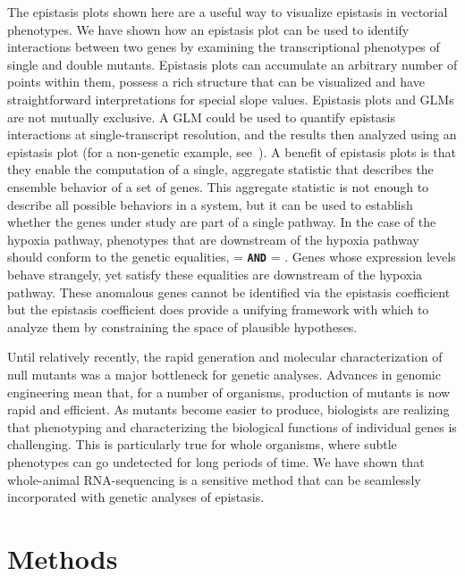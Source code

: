 The epistasis plots shown here are a useful way to visualize epistasis in
vectorial phenotypes. We have shown how an epistasis plot can be used to
identify interactions between two genes by examining the transcriptional
phenotypes of single and double mutants.
Epistasis plots can accumulate an
arbitrary number of points within them, possess a rich structure that can be
visualized and have straightforward interpretations for special slope values.
Epistasis plots and GLMs are not mutually exclusive. A GLM could be used to
quantify epistasis interactions at single-transcript resolution, and the results
then analyzed using an epistasis plot (for a non-genetic example,
see~\citet{Angeles-Albores2017a}).
A benefit of epistasis
plots is that they enable the computation of a single, aggregate statistic that
describes the ensemble behavior of a set of genes. This aggregate statistic
is not enough to describe all possible behaviors in a system, but it can be used
to establish whether the genes under study are part of a single pathway. In the
case of the hypoxia pathway, phenotypes that are downstream of the hypoxia
pathway should conform to the genetic equalities, \eglhif{} = \hif{}
\textbf{\texttt{AND}} \eglvhl{} = \egl{}. Genes whose expression levels behave
strangely, yet satisfy these equalities are downstream of the hypoxia pathway.
These anomalous genes cannot be identified via the epistasis coefficient but the
epistasis coefficient does provide a unifying framework with which to analyze
them by constraining the space of plausible hypotheses.

Until relatively recently, the rapid generation and molecular characterization
of null mutants was a major bottleneck for genetic analyses. Advances in
genomic engineering mean that, for a number of organisms, production of mutants
is now rapid and efficient. As mutants become easier to produce, biologists are
realizing that phenotyping and characterizing the biological functions of
individual genes is challenging. This is particularly true for whole organisms,
where subtle phenotypes can go undetected for long periods of time. We have
shown that whole-animal RNA-sequencing is a sensitive method that can be
seamlessly incorporated with genetic analyses of epistasis.


\section*{Methods}
